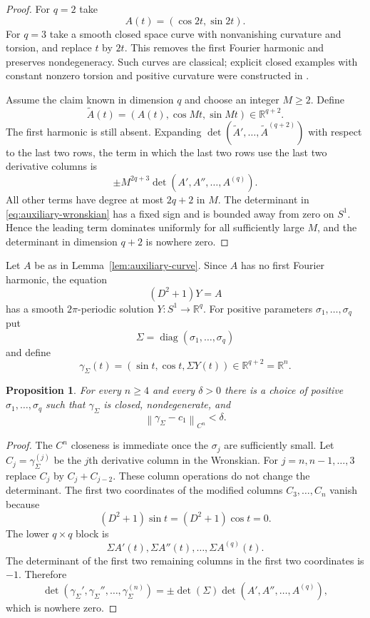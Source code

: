\documentclass[11pt,reqno]{amsart}
\newtheorem{proposition}[theorem]{Proposition}
\theoremstyle{definition}
\theoremstyle{remark}
\newcommand{\R}{\mathbb R}
\newcommand{\norm}[1]{\left\lVert #1\right\rVert}
\newcommand{\diag}{\operatorname{diag}}
\begin{document}
\begin{proof}
For $q=2$ take
\[
        A(t)=(\cos2t,\sin2t).
\]
For $q=3$ take a smooth closed space curve with nonvanishing curvature and
torsion, and replace $t$ by $2t$.  This removes the first Fourier harmonic and
preserves nondegeneracy.  Such curves are classical; explicit closed examples with
constant nonzero torsion and positive curvature were constructed in \cite{BatesMelko}.

Assume the claim known in dimension $q$ and choose an integer $M\ge2$.  Define
\[
        \widetilde A(t)=(A(t),\cos Mt,\sin Mt)\in\R^{q+2}.
\]
The first harmonic is still absent.  Expanding
$\det(\widetilde A',\ldots,\widetilde A^{(q+2)})$ with respect to the last two rows,
the term in which the last two rows use the last two derivative columns is
\[
        \pm M^{2q+3}\det(A',A'',\ldots,A^{(q)}).
\]
All other terms have degree at most $2q+2$ in $M$.  The determinant in
\eqref{eq:auxiliary-wronskian} has a fixed sign and is bounded away from zero on
$S^1$.  Hence the leading term dominates uniformly for all sufficiently large $M$,
and the determinant in dimension $q+2$ is nowhere zero.
\end{proof}

Let $A$ be as in Lemma~\ref{lem:auxiliary-curve}.  Since $A$ has no first Fourier
harmonic, the equation
\begin{equation}\label{eq:solve-D2-plus-one}
        (D^2+1)Y=A
\end{equation}
has a smooth $2\pi$-periodic solution $Y:S^1\to\R^q$.  For positive parameters
$\sigma_1,\ldots,\sigma_q$ put
\[
        \Sigma=\diag(\sigma_1,\ldots,\sigma_q)
\]
and define
\begin{equation}\label{eq:lifted-curve}
        \gamma_\Sigma(t)=(\sin t,\cos t,\Sigma Y(t))\in\R^{q+2}=\R^n .
\end{equation}

\begin{proposition}\label{prop:Cn-lift}
For every $n\ge4$ and every $\delta>0$ there is a choice of positive
$\sigma_1,\ldots,\sigma_q$ such that $\gamma_\Sigma$ is closed, nondegenerate, and
\[
        \norm{\gamma_\Sigma-c_1}_{C^n}<\delta .
\]
\end{proposition}

\begin{proof}
The $C^n$ closeness is immediate once the $\sigma_j$ are sufficiently small.  Let
$C_j=\gamma_\Sigma^{(j)}$ be the $j$th derivative column in the Wronskian.  For
$j=n,n-1,\ldots,3$ replace $C_j$ by $C_j+C_{j-2}$.  These column operations do not
change the determinant.  The first two coordinates of the modified columns
$C_3,\ldots,C_n$ vanish because
\[
        (D^2+1)\sin t=(D^2+1)\cos t=0.
\]
The lower $q\times q$ block is
\[
        \Sigma A'(t),\Sigma A''(t),\ldots,\Sigma A^{(q)}(t).
\]
The determinant of the first two remaining columns in the first two coordinates is
$-1$.  Therefore
\[
        \det(\gamma_\Sigma',\gamma_\Sigma'',\ldots,\gamma_\Sigma^{(n)})
        =\pm\det(\Sigma)\det(A',A'',\ldots,A^{(q)}),
\]
which is nowhere zero.
\end{proof}
\end{document}
